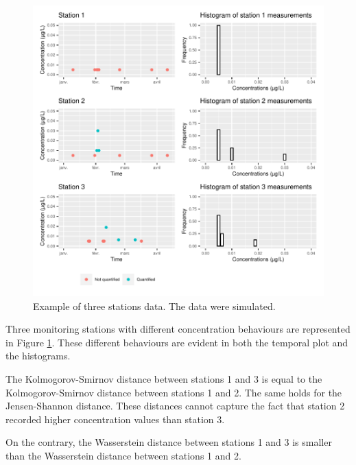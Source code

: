 \begin{figure}[htbp]
    \centering
    \includegraphics{figs/App/Simu_ex.pdf}
    \caption{Example of three stations data. The data were simulated.}
    \label{fig:ex_dist}
\end{figure}


Three monitoring stations with different concentration behaviours are represented in Figure \ref{fig:ex_dist}. These different behaviours are evident in both the temporal plot and the histograms. 

The Kolmogorov-Smirnov distance between stations 1 and 3 is equal to the Kolmogorov-Smirnov distance between stations 1 and 2. The same holds for the Jensen-Shannon distance. These distances cannot capture the fact that station 2 recorded higher concentration values than station 3. 

On the contrary, the Wasserstein distance between stations 1 and 3 is smaller than the Wasserstein distance between stations 1 and 2.


